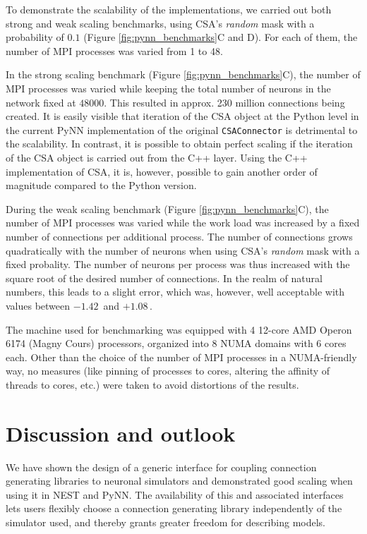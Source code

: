 \documentclass{frontiersSCNS} %
\newcommand{\permil}{\,\textperthousand\xspace}
\begin{document}
To demonstrate the scalability of the implementations, we carried out
both strong and weak scaling benchmarks, using CSA's \emph{random}
mask with a probability of $0.1$ (Figure \ref{fig:pynn_benchmarks}C
and D). For each of them, the number of MPI processes was varied from
1 to 48.

In the strong scaling benchmark (Figure \ref{fig:pynn_benchmarks}C),
the number of MPI processes was varied while keeping the total number
of neurons in the network fixed at $48000$. This resulted in
approx. 230 million connections being created. It is easily visible
that iteration of the CSA object at the Python level in the current
PyNN implementation of the original \verb|CSAConnector| is detrimental
to the scalability. In contrast, it is possible to obtain perfect
scaling if the iteration of the CSA object is carried out from the C++
layer. Using the C++ implementation of CSA, it is, however, possible
to gain another order of magnitude compared to the Python version.

During the weak scaling benchmark (Figure \ref{fig:pynn_benchmarks}C),
the number of MPI processes was varied while the work load was
increased by a fixed number of connections per additional process.
The number of connections grows quadratically with the number of
neurons when using CSA's \emph{random} mask with a fixed
probality. The number of neurons per process was thus increased with
the square root of the desired number of connections. In the realm of
natural numbers, this leads to a slight error, which was, however,
well acceptable with values between $-1.42$\permil and $+1.08$\permil.

The machine used for benchmarking was equipped with 4 12-core AMD
Operon 6174 (Magny Cours) processors, organized into 8 NUMA domains
with 6 cores each. Other than the choice of the number of MPI
processes in a NUMA-friendly way, no measures (like pinning of
processes to cores, altering the affinity of threads to cores, etc.)
were taken to avoid distortions of the results.


\section{Discussion and outlook}

We have shown the design of a generic interface for coupling
connection generating libraries to neuronal simulators and
demonstrated good scaling when using it in NEST and PyNN. The
availability of this and associated interfaces lets users flexibly
choose a connection generating library independently of the simulator
used, and thereby grants greater freedom for describing models.
\end{document}
